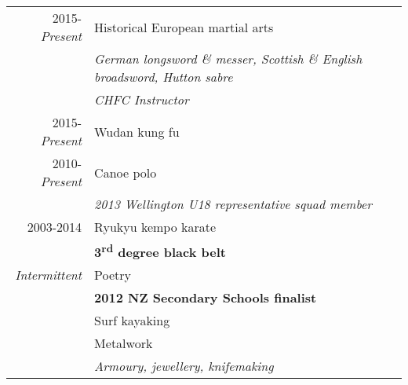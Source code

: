 \documentclass[a4paper,10pt]{article} %
\begin{document}
\begin{tabular}{rl}

2015-\emph{Present} & Historical European martial arts \\
& \quad \small\emph{German longsword \& messer, Scottish \& English broadsword, Hutton sabre} \\
& \quad \small\emph{CHFC Instructor} \\

2015-\emph{Present} & Wudan kung fu \\

2010-\emph{Present} & Canoe polo \\
& \quad \small\emph{2013 Wellington U18 representative squad member} \\

2003-2014 & Ryukyu kempo karate \\
& \quad \small\textbf{3\textsuperscript{rd} degree black belt} \\

\emph{Intermittent} & Poetry \\
& \quad \small\textbf{2012 NZ Secondary Schools finalist} \\
& Surf kayaking \\
& Metalwork \\
& \quad \small\emph{Armoury, jewellery, knifemaking}





	
\end{tabular}

\end{document}
